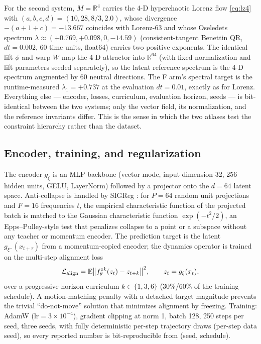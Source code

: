 \documentclass[journal]{IEEEtran}
\newcommand{\R}{\mathbb{R}}
\newcommand{\E}{\mathbb{E}}
\begin{document}
For the second system, $M=\R^4$ carries the 4-D hyperchaotic Lorenz
flow \eqref{eq:lz4} with $(a,b,c,d)=(10,28,8/3,2.0)$, whose divergence
$-(a+1+c)=-13.667$ coincides with Lorenz-63 and whose Oseledets
spectrum $\lambda\approx(+0.769,+0.098,0,-14.59)$ (consistent-tangent
Benettin QR, $dt=0.002$, 60 time units, float64) carries two positive
exponents. The identical lift $\phi$ and warp $W$ map the 4-D
attractor into $\R^{64}$ (with fixed normalization and lift parameters
seeded separately), so the latent reference spectrum is the 4-D
spectrum augmented by 60 neutral directions. The F arm's spectral
target is the runtime-measured $\lambda_1=+0.737$ at the evaluation
$dt=0.01$, exactly as for Lorenz. Everything else --- encoder,
losses, curriculum, evaluation horizon, seeds --- is bit-identical
between the two systems; only the vector field, its normalization, and
the reference invariants differ. This is the sense in which the two
atlases test the constraint hierarchy rather than the dataset.

\subsection{Encoder, training, and regularization}
\label{sec:methods-encoder}

The encoder $g_\xi$ is an MLP backbone (vector mode, input dimension 32,
256 hidden units, GELU, LayerNorm) followed by a projector onto the
$d=64$ latent space. Anti-collapse is handled by SIGReg
\cite{bardes2024sigreg}: for $P=64$ random unit projections and $F=16$
frequencies $t$, the empirical characteristic function of the projected
batch is matched to the Gaussian characteristic function
$\exp(-t^2/2)$, an Epps--Pulley-style test that penalizes collapse to a
point or a subspace without any teacher or momentum encoder. The
prediction target is the latent $g_{\xi^-}(x_{t+\tau})$ from a
momentum-copied encoder; the dynamics operator is trained on the
multi-step alignment loss
\begin{equation}
  \mathcal L_{\rm align}=\E\big\| f_\theta^{\circ k}(z_t) - z_{t+k}
  \big\|^2, \qquad z_t=g_\xi(x_t),
\end{equation}
over a progressive-horizon curriculum $k\in\{1,3,6\}$ (30\%/60\% of the
training schedule). A motion-matching penalty with a detached target
magnitude prevents the trivial ``do-not-move'' solution that minimizes
alignment by freezing. Training: AdamW ($\mathrm{lr}=3\times10^{-4}$),
gradient clipping at norm 1, batch 128, 250 steps per seed, three seeds,
with fully deterministic per-step trajectory draws (per-step data seed),
so every reported number is bit-reproducible from (seed, schedule).
\end{document}
